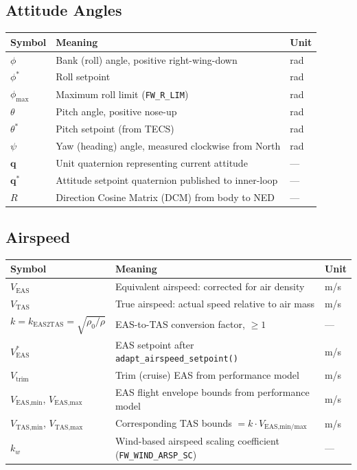 \documentclass[12pt,a4paper]{article}
\begin{document}
\subsection*{Attitude Angles}
\begin{center}\begin{tabular}{lll}\toprule
Symbol & Meaning & Unit \\\midrule
$\phi$ & Bank (roll) angle, positive right-wing-down & rad \\
$\phi^*$ & Roll setpoint & rad \\
$\phi_{\max}$ & Maximum roll limit (\texttt{FW\_R\_LIM}) & rad \\
$\theta$ & Pitch angle, positive nose-up & rad \\
$\theta^*$ & Pitch setpoint (from TECS) & rad \\
$\psi$ & Yaw (heading) angle, measured clockwise from North & rad \\
$\mathbf{q}$ & Unit quaternion representing current attitude & --- \\
$\mathbf{q}^*$ & Attitude setpoint quaternion published to inner-loop & --- \\
$R$ & Direction Cosine Matrix (DCM) from body to NED & --- \\
\bottomrule\end{tabular}\end{center}

\subsection*{Airspeed}
\begin{center}\begin{tabular}{lll}\toprule
Symbol & Meaning & Unit \\\midrule
$V_{\text{EAS}}$ & Equivalent airspeed: corrected for air density & m/s \\
$V_{\text{TAS}}$ & True airspeed: actual speed relative to air mass & m/s \\
$k = k_{\text{EAS2TAS}} = \sqrt{\rho_0/\rho}$ & EAS-to-TAS conversion factor, $\geq 1$ & --- \\
$V^*_{\text{EAS}}$ & EAS setpoint after \texttt{adapt\_airspeed\_setpoint()} & m/s \\
$V_{\text{trim}}$ & Trim (cruise) EAS from performance model & m/s \\
$V_{\text{EAS,min}}$, $V_{\text{EAS,max}}$ & EAS flight envelope bounds from performance model & m/s \\
$V_{\text{TAS,min}}$, $V_{\text{TAS,max}}$ & Corresponding TAS bounds $= k\cdot V_{\text{EAS,min/max}}$ & m/s \\
$k_w$ & Wind-based airspeed scaling coefficient (\texttt{FW\_WIND\_ARSP\_SC}) & --- \\
\bottomrule\end{tabular}\end{center}
\end{document}
